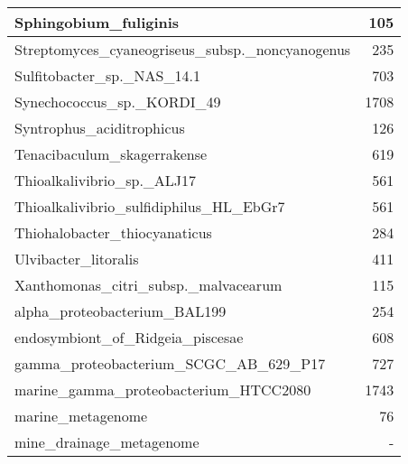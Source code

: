 \documentclass[12pt,a4paper]{article}
\begin{document}
\begin{table}[ht]
\begin{center}
\begin{tabular}{|l*{1}{|r}|}
Sphingobium\_fuliginis & 105 \\ \hline
Streptomyces\_cyaneogriseus\_subsp.\_noncyanogenus & 235 \\ \hline
Sulfitobacter\_sp.\_NAS\_14.1 & 703 \\ \hline
Synechococcus\_sp.\_KORDI\_49 & 1708 \\ \hline
Syntrophus\_aciditrophicus & 126 \\ \hline
Tenacibaculum\_skagerrakense & 619 \\ \hline
Thioalkalivibrio\_sp.\_ALJ17 & 561 \\ \hline
Thioalkalivibrio\_sulfidiphilus\_HL\_EbGr7 & 561 \\ \hline
Thiohalobacter\_thiocyanaticus & 284 \\ \hline
Ulvibacter\_litoralis & 411 \\ \hline
Xanthomonas\_citri\_subsp.\_malvacearum & 115 \\ \hline
alpha\_proteobacterium\_BAL199 & 254 \\ \hline
endosymbiont\_of\_Ridgeia\_piscesae & 608 \\ \hline
gamma\_proteobacterium\_SCGC\_AB\_629\_P17 & 727 \\ \hline
marine\_gamma\_proteobacterium\_HTCC2080 & 1743 \\ \hline
marine\_metagenome & 76 \\ \hline
mine\_drainage\_metagenome & - \\ \hline
\end{tabular}
\end{center}
\end{table}
\end{document}
